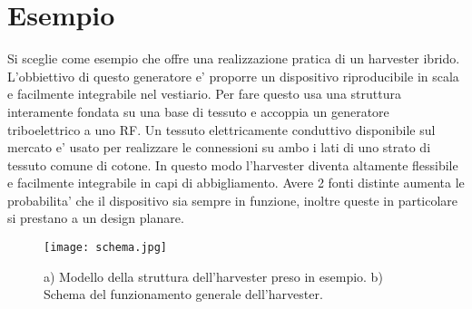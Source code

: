 \chapter{Esempio}
    Si sceglie come esempio \cite{kouWearableAllFabricHybrid2024} che offre una realizzazione pratica di un harvester ibrido. L'obbiettivo di questo generatore e' proporre un dispositivo riproducibile in scala e facilmente integrabile nel vestiario. Per fare questo usa una struttura interamente fondata su una base di tessuto e accoppia un generatore triboelettrico a uno RF. Un tessuto elettricamente conduttivo disponibile sul mercato e' usato per realizzare le connessioni su ambo i lati di uno strato di tessuto comune di cotone. In questo modo l'harvester diventa altamente flessibile e facilmente integrabile in capi di abbigliamento. Avere 2 fonti distinte aumenta le probabilita' che il dispositivo sia sempre in funzione, inoltre queste in particolare si prestano a un design planare.
    
    \begin{figure}[H]
        \texttt{[image: schema.jpg]}
        \centering
        \caption{a) Modello della struttura dell'harvester preso in esempio. b) Schema del funzionamento generale dell'harvester.\cite{kouWearableAllFabricHybrid2024}}
        \label{fig:schema}
    \end{figure}

